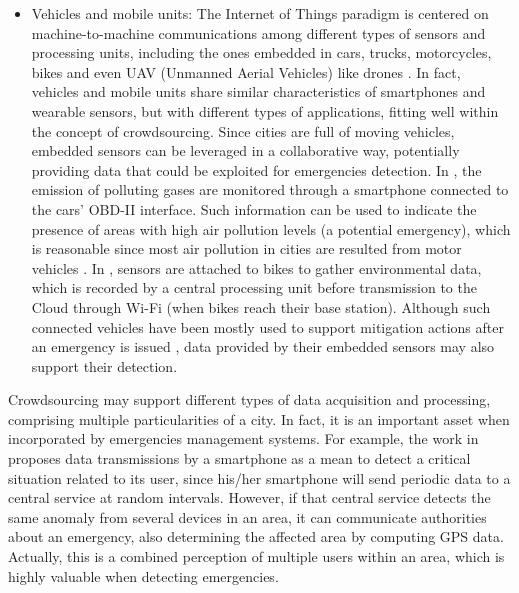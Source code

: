 \begin{refsection}
\begin{itemize}
    \item Vehicles and mobile units: The Internet of Things paradigm is centered on machine-to-machine communications among different types of sensors and processing units, including the ones embedded in cars, trucks, motorcycles, bikes and even UAV (Unmanned Aerial Vehicles) like drones \cite{iotsurvey,SurveyIoT}. In fact, vehicles and mobile units share similar characteristics of smartphones and wearable sensors, but with different types of applications, fitting well within the concept of crowdsourcing. Since cities are full of moving vehicles, embedded sensors can be leveraged in a collaborative way, potentially providing data that could be exploited for emergencies detection. In \cite{carpollution}, the emission of polluting gases are monitored through a smartphone connected to the cars' OBD-II interface. Such information can be used to indicate the presence of areas with high air pollution levels (a potential emergency), which is reasonable since most air pollution in cities are resulted from motor vehicles \cite{pollutioncities1}. In \cite{iotBike1}, sensors are attached to bikes to gather environmental data, which is recorded by a central processing unit before transmission to the Cloud through Wi-Fi (when bikes reach their base station). Although such connected vehicles have been mostly used to support mitigation actions after an emergency is issued \cite{mitigationDrone1,mitigationDrone2,mitigationITS1}, data provided by their embedded sensors may also support their detection.
    
\end{itemize}

Crowdsourcing may support different types of data acquisition and processing, comprising multiple particularities of a city. In fact, it is an important asset when incorporated by emergencies management systems. For example, the work in \cite{crowdsourcing4} proposes data transmissions by a smartphone as a mean to detect a critical situation related to its user, since his/her smartphone will send periodic data to a central service at random intervals. However, if that central service detects the same anomaly from several devices in an area, it can communicate authorities about an emergency, also determining the affected area by computing GPS data. Actually, this is a combined perception of multiple users within an area, which is highly valuable when detecting emergencies.


\end{refsection}
